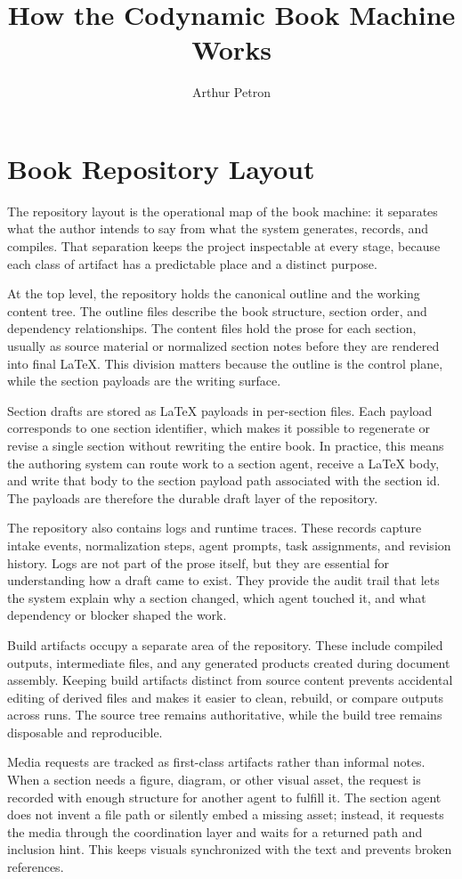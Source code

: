 \documentclass[11pt]{article}
\title{How the Codynamic Book Machine Works}
\author{Arthur Petron}
\begin{document}
\section*{Book Repository Layout}

The repository layout is the operational map of the book machine: it separates what the author intends to say from what the system generates, records, and compiles. That separation keeps the project inspectable at every stage, because each class of artifact has a predictable place and a distinct purpose.

At the top level, the repository holds the canonical outline and the working content tree. The outline files describe the book structure, section order, and dependency relationships. The content files hold the prose for each section, usually as source material or normalized section notes before they are rendered into final \LaTeX{}. This division matters because the outline is the control plane, while the section payloads are the writing surface.

Section drafts are stored as \LaTeX{} payloads in per-section files. Each payload corresponds to one section identifier, which makes it possible to regenerate or revise a single section without rewriting the entire book. In practice, this means the authoring system can route work to a section agent, receive a \LaTeX{} body, and write that body to the section payload path associated with the section id. The payloads are therefore the durable draft layer of the repository.

The repository also contains logs and runtime traces. These records capture intake events, normalization steps, agent prompts, task assignments, and revision history. Logs are not part of the prose itself, but they are essential for understanding how a draft came to exist. They provide the audit trail that lets the system explain why a section changed, which agent touched it, and what dependency or blocker shaped the work.

Build artifacts occupy a separate area of the repository. These include compiled outputs, intermediate files, and any generated products created during document assembly. Keeping build artifacts distinct from source content prevents accidental editing of derived files and makes it easier to clean, rebuild, or compare outputs across runs. The source tree remains authoritative, while the build tree remains disposable and reproducible.

Media requests are tracked as first-class artifacts rather than informal notes. When a section needs a figure, diagram, or other visual asset, the request is recorded with enough structure for another agent to fulfill it. The section agent does not invent a file path or silently embed a missing asset; instead, it requests the media through the coordination layer and waits for a returned path and inclusion hint. This keeps visuals synchronized with the text and prevents broken references.
\end{document}
